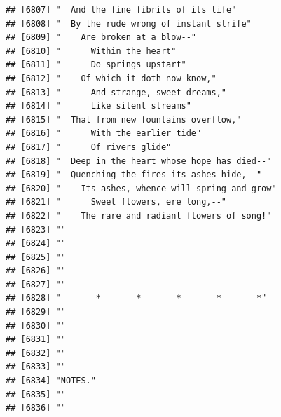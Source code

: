 \documentclass{article}\usepackage[]{graphicx}\usepackage[]{color}
\makeatletter
\newenvironment{kframe}{%
 \def\at@end@of@kframe{}%
 \ifinner\ifhmode%
  \def\at@end@of@kframe{\end{minipage}}%
  \begin{minipage}{\columnwidth}%
 \fi\fi%
 \def\FrameCommand##1{\hskip\@totalleftmargin \hskip-\fboxsep
 \colorbox{shadecolor}{##1}\hskip-\fboxsep
     \hskip-\linewidth \hskip-\@totalleftmargin \hskip\columnwidth}%
 \MakeFramed {\advance\hsize-\width
   \@totalleftmargin\z@ \linewidth\hsize
   \@setminipage}}%
 {\par\unskip\endMakeFramed%
 \at@end@of@kframe}
\newenvironment{knitrout}{}{} %
\makeatother
\begin{document}
\begin{knitrout}
\begin{kframe}
\begin{verbatim}
## [6807] "  And the fine fibrils of its life"                                          
## [6808] "  By the rude wrong of instant strife"                                       
## [6809] "    Are broken at a blow--"                                                  
## [6810] "      Within the heart"                                                      
## [6811] "      Do springs upstart"                                                    
## [6812] "    Of which it doth now know,"                                              
## [6813] "      And strange, sweet dreams,"                                            
## [6814] "      Like silent streams"                                                   
## [6815] "  That from new fountains overflow,"                                         
## [6816] "      With the earlier tide"                                                 
## [6817] "      Of rivers glide"                                                       
## [6818] "  Deep in the heart whose hope has died--"                                   
## [6819] "  Quenching the fires its ashes hide,--"                                     
## [6820] "    Its ashes, whence will spring and grow"                                  
## [6821] "      Sweet flowers, ere long,--"                                            
## [6822] "    The rare and radiant flowers of song!"                                   
## [6823] ""                                                                            
## [6824] ""                                                                            
## [6825] ""                                                                            
## [6826] ""                                                                            
## [6827] ""                                                                            
## [6828] "       *       *       *       *       *"                                    
## [6829] ""                                                                            
## [6830] ""                                                                            
## [6831] ""                                                                            
## [6832] ""                                                                            
## [6833] ""                                                                            
## [6834] "NOTES."                                                                      
## [6835] ""                                                                            
## [6836] ""                                                                            

\end{verbatim}
\end{kframe}
\end{knitrout}
\end{document}
